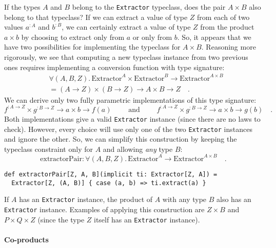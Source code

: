 If the types $A$ and $B$ belong to the \lstinline!Extractor! typeclass,
does the pair $A\times B$ also belong to that typeclass? If we can
extract a value of type $Z$ from each of two values $a^{:A}$ and
$b^{:B}$, we can certainly extract a value of type $Z$ from the
product $a\times b$ by choosing to extract only from $a$ or only
from $b$. So, it appears that we have two possibilities for implementing
the typeclass for $A\times B$. Reasoning more rigorously, we see
that computing a new typeclass instance from two previous ones requires
implementing a conversion function with type signature:
\begin{align*}
 & \forall(A,B,Z).\,\text{Extractor}^{A}\times\text{Extractor}^{B}\rightarrow\text{Extractor}^{A\times B}\\
 & =\left(A\rightarrow Z\right)\times\left(B\rightarrow Z\right)\rightarrow A\times B\rightarrow Z\quad.
\end{align*}
We can derive only two fully parametric implementations of this type
signature: 
\[
f^{:A\rightarrow Z}\times g^{:B\rightarrow Z}\rightarrow a\times b\rightarrow f(a)\quad\quad\text{ and }\quad\quad f^{:A\rightarrow Z}\times g^{:B\rightarrow Z}\rightarrow a\times b\rightarrow g(b)\quad.
\]
Both implementations give a valid \lstinline!Extractor! instance
(since there are no laws to check). However, every choice will use
only one of the two \lstinline!Extractor! instances and ignore the
other. So, we can simplify this construction by keeping the typeclass
constraint only for $A$ and allowing \emph{any} type $B$:
\[
\text{extractorPair}:\forall(A,B,Z).\,\text{Extractor}^{A}\rightarrow\text{Extractor}^{A\times B}\quad.
\]
\begin{lstlisting}
def extractorPair[Z, A, B](implicit ti: Extractor[Z, A]) =
  Extractor[Z, (A, B)] { case (a, b) => ti.extract(a) }
\end{lstlisting}
If $A$ has an \lstinline!Extractor! instance, the product of $A$
with any type $B$ also has an \lstinline!Extractor! instance. Examples
of applying this construction are $Z\times B$ and $P\times Q\times Z$
(since the type $Z$ itself has an \lstinline!Extractor! instance).

\paragraph{Co-products}

